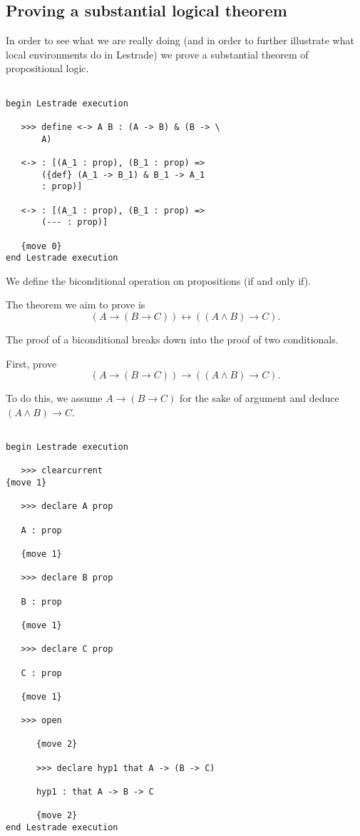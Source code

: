 \documentclass[12pt]{article}
\begin{document}
\newpage

\subsection{Proving a substantial logical theorem}

In order to see what we are really doing (and in order to further illustrate what local environments do in Lestrade) we prove a substantial theorem of propositional logic.

\begin{verbatim}

begin Lestrade execution

   >>> define <-> A B : (A -> B) & (B -> \
       A)

   <-> : [(A_1 : prop), (B_1 : prop) => 
       ({def} (A_1 -> B_1) & B_1 -> A_1 
       : prop)]

   <-> : [(A_1 : prop), (B_1 : prop) => 
       (--- : prop)]

   {move 0}
end Lestrade execution

\end{verbatim}

We define the biconditional operation on propositions (if and only if).

The theorem we aim to prove is $$(A \rightarrow (B \rightarrow C)) \leftrightarrow ((A \wedge B) \rightarrow C).$$

The proof of a biconditional breaks down into the proof of two conditionals.

First, prove $$(A \rightarrow (B \rightarrow C)) \rightarrow ((A \wedge B) \rightarrow C).$$

To do this, we assume $A \rightarrow (B \rightarrow C)$ for the sake of argument and deduce $(A \wedge B) \rightarrow C$.

\begin{verbatim}

begin Lestrade execution

   >>> clearcurrent
{move 1}

   >>> declare A prop

   A : prop

   {move 1}

   >>> declare B prop

   B : prop

   {move 1}

   >>> declare C prop

   C : prop

   {move 1}

   >>> open

      {move 2}

      >>> declare hyp1 that A -> (B -> C)

      hyp1 : that A -> B -> C

      {move 2}
end Lestrade execution

\end{verbatim}
\end{document}
